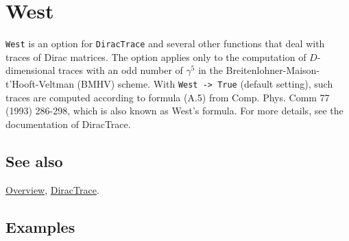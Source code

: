 \documentclass[../FeynCalcManual.tex]{subfiles}
\begin{document}
\hypertarget{west}{%
\section{West}\label{west}}

\texttt{West} is an option for \texttt{DiracTrace} and several other
functions that deal with traces of Dirac matrices. The option applies
only to the computation of \(D\)-dimensional traces with an odd number
of \(\gamma ^5\) in the Breitenlohner-Maison-t'Hooft-Veltman (BMHV)
scheme. With \texttt{West -> True} (default setting), such traces are
computed according to formula (A.5) from Comp. Phys. Comm 77 (1993)
286-298, which is also known as West's formula. For more details, see
the documentation of DiracTrace.

\subsection{See also}

\hyperlink{toc}{Overview}, \hyperlink{diractrace}{DiracTrace}.

\subsection{Examples}
\end{document}
